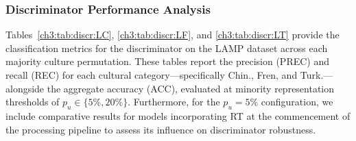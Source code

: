 \subsubsection{Discriminator Performance Analysis}
\label{sec:res:discr}
Tables~\ref{ch3:tab:discr:LC}, \ref{ch3:tab:discr:LF}, and \ref{ch3:tab:discr:LT} provide the classification metrics for the discriminator on the LAMP dataset across each majority culture permutation. 
These tables report the precision (PREC) and recall (REC) for each cultural category—specifically Chin., Fren, and Turk.—alongside the aggregate accuracy (ACC), evaluated at minority representation thresholds of $p_u \in \{5\%, 20\%\}$. 
Furthermore, for the $p_u = 5\%$ configuration, we include comparative results for models incorporating RT at the commencement of the processing pipeline to assess its influence on discriminator robustness.
%
